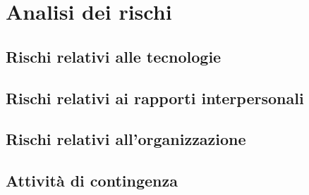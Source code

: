 \section{Analisi dei rischi} \label{analisi_dei_rischi}

\subsection{Rischi relativi alle tecnologie} \label{rischi_tecnologie}

\subsection{Rischi relativi ai rapporti interpersonali} \label{rischi_rapporti}

\subsection{Rischi relativi all'organizzazione} \label{rischi_organizzazione}

\subsection{Attività di contingenza} \label{attivita_contingenza}
